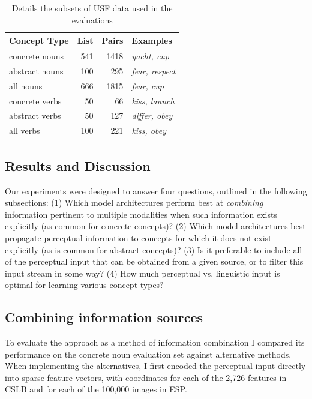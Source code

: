  \begin{table}[t]\begin{center}\begin{tabular}{l|r|r|p{2.1cm}}



\bf Concept Type & \bf  List & \bf Pairs & \bf Examples \\ 

\hline concrete nouns & 541 & 1418 & \emph{yacht, cup} \\

abstract nouns & 100 & 295 & \emph{fear, respect} \\

all nouns & 666 & 1815 & \emph{fear, cup} \\

concrete verbs & 50 & 66 & \emph{kiss, launch} \\

abstract verbs & 50 & 127 & \emph{differ, obey} \\

all verbs & 100 & 221 & \emph{kiss, obey} \\

\end{tabular}\end{center}\caption{\label{set_details} Details the subsets of USF data used in the evaluations}\end{table}






\subsection{Results and Discussion}

Our experiments were designed to answer four questions, outlined in the following subsections: (1) Which model architectures perform best at \emph{combining} information pertinent to multiple modalities when such information exists explicitly (as common for concrete concepts)? (2) Which model architectures best propagate perceptual information to concepts for which it does not exist explicitly (as is common for abstract concepts)? (3) Is it preferable to include all of the perceptual input that can be obtained from a given source, or to filter this input stream in some way? (4) How much perceptual vs. linguistic input is optimal for learning various concept types? 

\subsection{Combining information sources} 
\label{conc1}
To evaluate the approach as a method of information combination I compared its performance on the concrete noun evaluation set against alternative methods. When implementing the alternatives, I first encoded the perceptual input directly into sparse feature vectors, with coordinates for each of the 2,726 features in CSLB and for each of the 100,000 images in ESP. 


